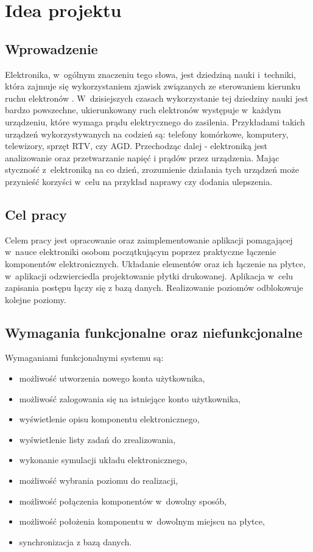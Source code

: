 \documentclass[12pt, a4paper]{article} %
\begin{document}

\tableofcontents

\clearpage
\section{Idea projektu}

\subsection{Wprowadzenie}
\aka Elektronika, w~ogólnym znaczeniu tego słowa, jest dziedziną nauki i~techniki, która zajmuje się wykorzystaniem zjawisk związanych ze sterowaniem kierunku ruchu elektronów \cite{definicja_elektornika}. W~dzisiejszych czasach wykorzystanie tej dziedziny nauki jest bardzo powszechne, ukierunkowany ruch elektronów występuje w~każdym urządzeniu, które wymaga prądu elektrycznego do zasilenia. Przykładami takich urządzeń wykorzystywanych na codzień są: telefony komórkowe, komputery, telewizory, sprzęt RTV, czy AGD. Przechodząc dalej - elektroniką jest analizowanie oraz przetwarzanie napięć i prądów przez urządzenia.
Mając styczność z~elektroniką na co dzień, zrozumienie działania tych urządzeń może przynieść korzyści w~celu na przykład naprawy czy dodania ulepszenia.


\subsection{Cel pracy}
\aka Celem pracy jest opracowanie oraz zaimplementowanie aplikacji pomagającej w~nauce elektroniki osobom początkującym poprzez praktyczne łączenie komponentów elektronicznych. Układanie elementów oraz ich łączenie na płytce, w~aplikacji odzwierciedla projektowanie płytki drukowanej. Aplikacja w~celu zapisania postępu łączy się z bazą danych. Realizowanie poziomów odblokowuje kolejne poziomy.

\subsection{Wymagania funkcjonalne oraz niefunkcjonalne}
Wymaganiami funkcjonalnymi systemu są:
\begin{itemize}[nosep]
	\item możliwość utworzenia nowego konta użytkownika,
	\item możliwość zalogowania się na istniejące konto użytkownika,
	\item wyświetlenie opisu komponentu elektronicznego,
	\item wyświetlenie listy zadań do zrealizowania,
	\item wykonanie symulacji układu elektronicznego,
	\item możliwość wybrania poziomu do realizacji,
	\item możliwość połączenia komponentów w~dowolny sposób,
	\item możliwość położenia komponentu w~dowolnym miejscu na płytce,
	\item synchronizacja z bazą danych.
\end{itemize}
\end{document}
